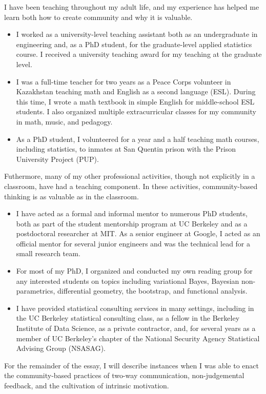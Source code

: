 I have been teaching throughout my adult life, and my experience has helped me
learn both how to create community and why it is valuable.
%
\begin{itemize}
    \item I worked as a university-level teaching assistant both as an
    undergraduate in engineering and, as a PhD student, for the
    graduate-level applied statistics course. I received a university teaching
    award for my teaching at the graduate level.
%
    \item I was a full-time teacher for two years as a Peace Corps volunteer in
    Kazakhstan teaching math and English as a second language (ESL).  During
    this time, I wrote a math textbook in simple English for middle-school ESL
    students.  I also organized multiple extracurricular classes for my
    community in math, music, and pedagogy.
%
    \item As a PhD student, I volunteered for a year and a half teaching math
    courses, including statistics, to inmates at San Quentin prison with the
    Prison University Project (PUP).
%
\end{itemize}

Futhermore, many of my other professional activities, though not explicitly in a
classroom, have had a teaching component.  In these activities, community-based
thinking is as valuable as in the classroom.
%
\begin{itemize}
    \item I have acted as a formal and informal mentor to numerous PhD students,
    both as part of the student mentorship program at UC Berkeley and as a
    postdoctoral researcher at MIT.  As a senior engineer at Google, I acted as
    an official mentor for several junior engineers and was the technical lead
    for a small research team.
%
    \item For most of my PhD, I organized and conducted my own reading group for
    any interested students on topics including variational Bayes, Bayesian
    non-parametrics, differential geometry, the bootstrap, and functional
    analysis.
%
    \item I have provided statistical consulting services in many settings,
    including in the UC Berkeley statistical consulting class, as a fellow in
    the Berkeley Institute of Data Science, as a private contractor, and, for
    several years as a member of UC Berkeley's chapter of the National Security
    Agency Statistical Advising Group (NSASAG).
%
\end{itemize}
%
For the remainder of the essay, I will describe instances when I was able to
enact the community-based practices of two-way communication, non-judgemental
feedback, and the cultivation of intrinsic motivation.


